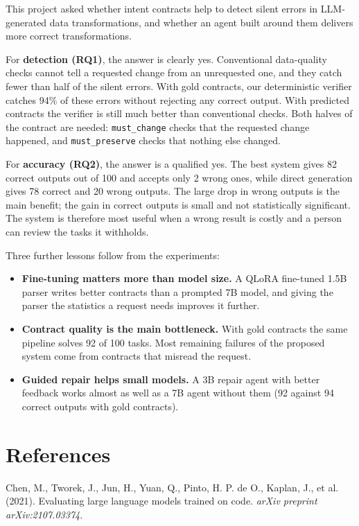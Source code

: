 \documentclass[11pt]{article}
\providecommand{\tightlist}{\setlength{\itemsep}{0pt}\setlength{\parskip}{0pt}}
\begin{document}
This project asked whether intent contracts help to detect silent errors
in LLM-generated data transformations, and whether an agent built around
them delivers more correct transformations.

For \textbf{detection (RQ1)}, the answer is clearly yes. Conventional
data-quality checks cannot tell a requested change from an unrequested
one, and they catch fewer than half of the silent errors. With gold
contracts, our deterministic verifier catches 94\% of these errors
without rejecting any correct output. With predicted contracts the
verifier is still much better than conventional checks. Both halves of
the contract are needed: \texttt{must\_\allowbreak{}change} checks that
the requested change happened, and \texttt{must\_\allowbreak{}preserve}
checks that nothing else changed.

For \textbf{accuracy (RQ2)}, the answer is a qualified yes. The best
system gives 82 correct outputs out of 100 and accepts only 2 wrong
ones, while direct generation gives 78 correct and 20 wrong outputs. The
large drop in wrong outputs is the main benefit; the gain in correct
outputs is small and not statistically significant. The system is
therefore most useful when a wrong result is costly and a person can
review the tasks it withholds.

Three further lessons follow from the experiments:

\begin{itemize}
\tightlist
\item
  \textbf{Fine-tuning matters more than model size.} A QLoRA fine-tuned
  1.5B parser writes better contracts than a prompted 7B model, and
  giving the parser the statistics a request needs improves it further.
\item
  \textbf{Contract quality is the main bottleneck.} With gold contracts
  the same pipeline solves 92 of 100 tasks. Most remaining failures of
  the proposed system come from contracts that misread the request.
\item
  \textbf{Guided repair helps small models.} A 3B repair agent with
  better feedback works almost as well as a 7B agent without them (92
  against 94 correct outputs with gold contracts).
\end{itemize}

\section{References}

Chen, M., Tworek, J., Jun, H., Yuan, Q., Pinto, H. P. de O., Kaplan, J.,
et al. (2021). Evaluating large language models trained on code.
\emph{arXiv preprint arXiv:2107.03374}.
\end{document}

